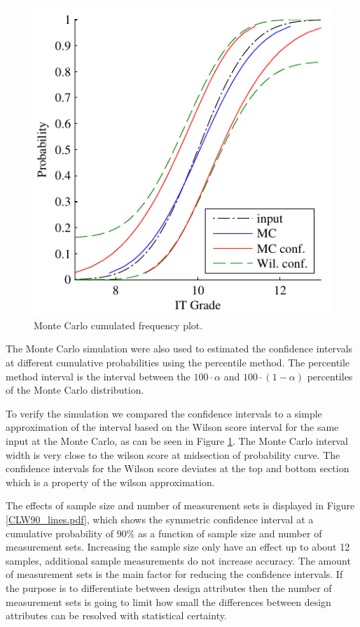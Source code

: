 \documentclass[aip,amsmath, reprint, author-year]{revtex4-1}
\begin{document}
\begin{figure}
\includegraphics{confidenceIntervals.pdf}
\caption{\label{fig:confidenceIntervals} Monte Carlo cumulated frequency plot.}
\end{figure}

The Monte Carlo simulation were also used to estimated the confidence intervals at different cumulative probabilities using the percentile method.
The percentile method interval is the interval between the $100 \cdot \alpha$ and $100 \cdot (1-\alpha)$ percentiles of the Monte Carlo distribution. 

To verify the simulation we compared the confidence intervals to a simple approximation of the interval based on the Wilson score interval for the same input at the Monte Carlo, as can be seen in Figure \ref{fig:confidenceIntervals}. The Monte Carlo interval width is very close to the wilson score at midsection of probability curve. 
The confidence intervals for the Wilson score deviates at the top and bottom section which is a property of the wilson approximation.

The effects of sample size and number of measurement sets is displayed in Figure \ref{CLW90_lines.pdf}, which shows the symmetric confidence interval at a cumulative probability of $90\%$ as a function of sample size and number of measurement sets. Increasing the sample size only have an effect up to about 12 samples, additional sample measurements do not increase accuracy. The amount of measurement sets is the main factor for reducing the confidence intervals. If the purpose is to differentiate between design attributes then the number of measurement sets is going to limit how small the differences between design attributes can be resolved with statistical certainty.
\end{document}

